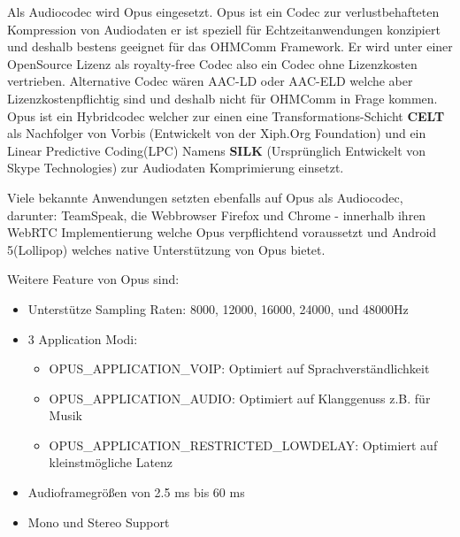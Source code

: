 Als Audiocodec wird Opus eingesetzt. Opus ist ein Codec zur verlustbehafteten Kompression von Audiodaten er ist speziell für Echtzeitanwendungen konzipiert und deshalb bestens geeignet für das OHMComm Framework. Er wird unter einer OpenSource Lizenz als royalty-free Codec also ein Codec ohne Lizenzkosten vertrieben. Alternative Codec wären AAC-LD oder AAC-ELD welche aber Lizenzkostenpflichtig sind und deshalb nicht für OHMComm in Frage kommen. Opus ist ein Hybridcodec welcher zur einen eine Transformations-Schicht \textbf{CELT} als Nachfolger von Vorbis (Entwickelt von der Xiph.Org Foundation) und ein Linear Predictive Coding(LPC) Namens \textbf{SILK} (Ursprünglich Entwickelt von Skype Technologies) zur Audiodaten Komprimierung einsetzt.

Viele bekannte Anwendungen setzten ebenfalls auf Opus als Audiocodec, darunter: TeamSpeak, die Webbrowser Firefox und Chrome - innerhalb ihren WebRTC Implementierung welche Opus verpflichtend voraussetzt und Android 5(Lollipop) welches native Unterstützung von Opus bietet.

Weitere Feature von Opus sind:

\begin{itemize}
\item Unterstütze Sampling Raten: 8000, 12000, 16000, 24000, und 48000Hz
\item 3 Application Modi:
\begin{itemize}
\item OPUS\_APPLICATION\_VOIP: Optimiert auf Sprachverständlichkeit
\item OPUS\_APPLICATION\_AUDIO: Optimiert auf Klanggenuss z.B. für Musik
\item OPUS\_APPLICATION\_RESTRICTED\_LOWDELAY: Optimiert auf kleinstmögliche Latenz
\end{itemize}
\item Audioframegrößen von 2.5 ms bis 60 ms
\item Mono und Stereo Support
\end{itemize}


